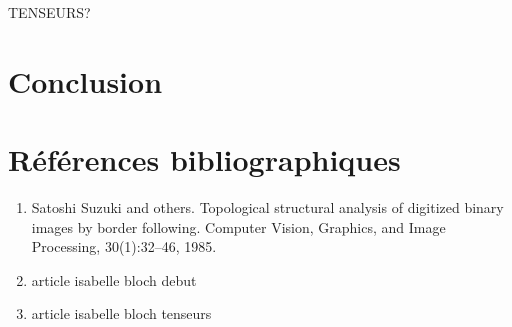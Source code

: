 \documentclass[a4paper,12pt]{report}
\begin{document}
  TENSEURS?
\chapter {Conclusion}
\chapter*{Références bibliographiques}
\begin{enumerate}
	\item Satoshi Suzuki and others. Topological structural analysis of digitized binary images by border following. Computer Vision, Graphics, and Image Processing, 30(1):32–46, 1985.
	\item article isabelle bloch debut
	\item article isabelle bloch tenseurs
	
\end{enumerate}
 
\end{document}
